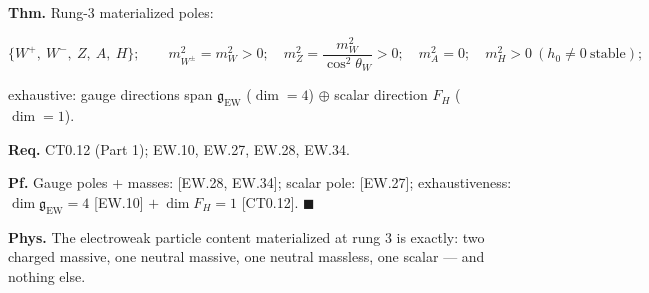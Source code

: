 \begin{theorem}\label{tag:EW-29}
\textbf{Thm.} Rung-3 materialized poles:

\[
\{W^+,\ W^-,\ Z,\ A,\ H\};\qquad
m_{W^\pm}^2=m_W^2>0;\quad m_Z^2=\frac{m_W^2}{\cos^2\theta_W}>0;\quad m_A^2=0;\quad m_H^2>0\ (h_0\ne0\ \text{stable});
\]

exhaustive: gauge directions span $\mathfrak g_{\mathrm{EW}}$ ($\dim=4$) $\oplus$ scalar direction $F_H$ ($\dim=1$).

\textbf{Req.} CT0.12 (Part 1); EW.10, EW.27, EW.28, EW.34.

\textbf{Pf.} Gauge poles + masses: [EW.28, EW.34]; scalar pole: [EW.27]; exhaustiveness: $\dim\mathfrak g_{\mathrm{EW}}=4$ [EW.10] $+\ \dim F_H=1$ [CT0.12]. $\blacksquare$

\textbf{Phys.} The electroweak particle content materialized at rung 3 is exactly: two charged massive, one neutral massive, one neutral massless, one scalar — and nothing else.

\end{theorem}

